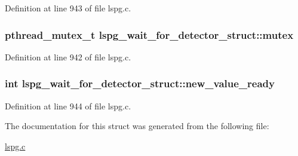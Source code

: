 Definition at line 943 of file lspg.\-c.

\hypertarget{structlspg__wait__for__detector__struct_a958e9fe59e671e61f95c2ce796ba24ce}{
\subsubsection[{mutex}]{\setlength{\rightskip}{0pt plus 5cm}pthread\-\_\-mutex\-\_\-t lspg\-\_\-wait\-\_\-for\-\_\-detector\-\_\-struct\-::mutex}}\label{structlspg__wait__for__detector__struct_a958e9fe59e671e61f95c2ce796ba24ce}


Definition at line 942 of file lspg.\-c.

\hypertarget{structlspg__wait__for__detector__struct_ad950e85c70c4473c5c7c40f8ceeae61d}{
\subsubsection[{new\-\_\-value\-\_\-ready}]{\setlength{\rightskip}{0pt plus 5cm}int lspg\-\_\-wait\-\_\-for\-\_\-detector\-\_\-struct\-::new\-\_\-value\-\_\-ready}}\label{structlspg__wait__for__detector__struct_ad950e85c70c4473c5c7c40f8ceeae61d}


Definition at line 944 of file lspg.\-c.



The documentation for this struct was generated from the following file\-:\begin{DoxyCompactItemize}
\item 
\hyperlink{lspg_8c}{lspg.\-c}\end{DoxyCompactItemize}
